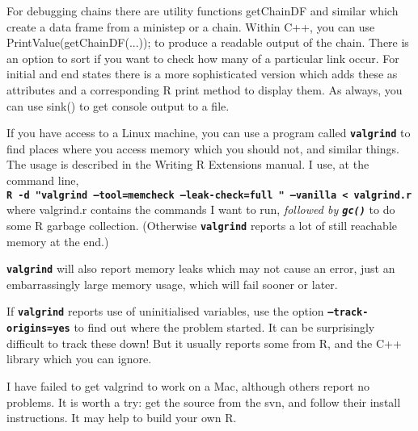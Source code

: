 \documentclass[12pt, a4paper]{article}
\renewcommand{\=}{\,=\,}
\newcommand{\+}{\,+\,}
\newcommand{\sfn}[1]{\textbf{\texttt{#1}}}
\begin{document}
For debugging chains there are utility functions \textsf{getChainDF} and similar
which create a data frame from a ministep or a chain. Within C++, you can use
\textsf{PrintValue(getChainDF(...));} to produce a readable output of the
chain. There is an option to sort if you want to check how many of a particular
link occur. For initial and end states there is a more sophisticated version
which adds these as attributes and a corresponding R print method to display
them. As always, you can use sink() to get console output to a file.

If you have access to a Linux machine, you can use a program called
\sfn{valgrind} to find places where you access memory which you should not, and
similar things. The usage is described in the Writing R Extensions manual. I
use, at the command line,\\
\sfn{R -d "valgrind --tool=memcheck --leak-check=full " --vanilla < valgrind.r}
\\
where valgrind.r contains the commands I want to run, \emph{followed by
  \sfn{gc()}} to do some R garbage collection. (Otherwise \sfn{valgrind} reports
a lot of still reachable memory at the end.)

\sfn{valgrind} will also report memory leaks which may not cause an error, just
an embarrassingly large memory usage, which will fail sooner or later.

If \sfn{valgrind} reports use of uninitialised variables, use the option
\sfn{--track-origins=yes} to find out where the problem started. It can be
surprisingly difficult to track these down! But it usually reports some from R,
and the C++ library which you can ignore.

I have failed to get valgrind to work on a Mac, although others report no
problems. It is worth a try: get the source from the svn, and follow their
install instructions. It may help to build your own R.
\end{document}
